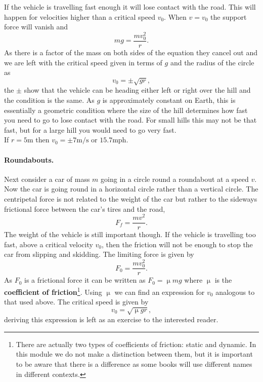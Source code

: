 \documentclass[a4paper,12pt]{book}
\begin{document}
If the vehicle is travelling fast enough it will lose contact with the road. This will happen for velocities higher than a critical speed $v_{0}$. When $v=v_{0}$ the support force will vanish and
\begin{equation*}
mg=\frac{mv^{2}_{0}}{r}.
\end{equation*}
As there is a factor of the mass on both sides of the equation they cancel out and we are left with the critical speed given in terms of $g$ and the radius of the circle as
\begin{equation*}
v_{0}=\pm\sqrt{gr},
\end{equation*}
the $\pm$ show that the vehicle can be heading either left or right over the hill and the condition is the same. As $g$ is approximately constant on Earth, this is essentially a geometric condition where the size of the hill determines how fast you need to go to lose contact with the road. For small hills this may not be that fast, but for a large hill you would need to go very fast.\\

If $r=5\text{m}$ then $v_{0}=\pm 7\text{m/s}$ or $15.7\text{mph}$.

\paragraph{Roundabouts.} Next consider a car of mass $m$ going in a circle round a roundabout at a speed $v$. Now the car is going round in a horizontal circle rather than a vertical circle. The centripetal force is not related to the weight of the car but rather to the sideways frictional force between the car's tires and the road,
\begin{equation*}
F_{f}=\frac{mv^{2}}{r}.
\end{equation*}
The weight of the vehicle is still important though. If the vehicle is travelling too fast, above a critical velocity $v_{0}$, then the friction will not be enough to stop the car from slipping and skidding. The limiting force is given by
\begin{equation*}
F_{0}=\frac{mv_{0}^{2}}{r}.
\end{equation*}
As $F_{0}$ is a frictional force it can be written as $F_{0}=\upmu mg$ where $\upmu$ is the \textbf{coefficient of friction}\footnote{There are actually two types of coefficients of friction: static and dynamic. In this module we do not make a distinction between them, but it is important to be aware that there is a difference as some books will use different names in different contexts.}.  Using $\upmu$ we can find an expression for $v_{0}$ analogous to that used above. The critical speed is given by
\begin{equation*}
v_{0}=\sqrt{\upmu g r},
\end{equation*}
deriving this expression is left as an exercise to the interested reader.
\end{document}
